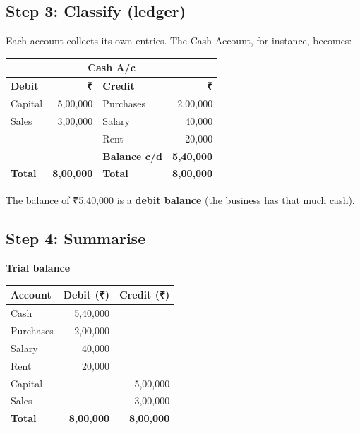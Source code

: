 \documentclass[11pt,a4paper]{article}
\newcommand{\Rs}{{\rsfont ₹}}
\begin{document}
\subsection{Step 3: Classify (ledger)}

Each account collects its own entries. The Cash Account, for instance, becomes:

\begin{center}
\small
\begin{tabular}{@{}p{2.6cm} r | p{2.6cm} r@{}}
\multicolumn{4}{c}{\textbf{Cash A/c}}\\
\hline
\textbf{Debit} & \textbf{\Rs} & \textbf{Credit} & \textbf{\Rs}\\
\hline
Capital & 5,00,000 & Purchases & 2,00,000\\
Sales & 3,00,000 & Salary & 40,000\\
 & & Rent & 20,000\\
 & & \textbf{Balance c/d} & \textbf{5,40,000}\\
\hline
\textbf{Total} & \textbf{8,00,000} & \textbf{Total} & \textbf{8,00,000}\\
\hline
\end{tabular}
\end{center}

The balance of \Rs 5,40,000 is a \textbf{debit balance} (the business has that much cash).

\subsection{Step 4: Summarise}

\textbf{Trial balance}

\begin{center}
\small
\begin{tabular}{@{}l r r@{}}
\toprule
\rowcolor{acteal!15}\textbf{Account} & \textbf{Debit (\Rs)} & \textbf{Credit (\Rs)}\\
\midrule
Cash & 5,40,000 & \\
Purchases & 2,00,000 & \\
Salary & 40,000 & \\
Rent & 20,000 & \\
Capital & & 5,00,000\\
Sales & & 3,00,000\\
\midrule
\textbf{Total} & \textbf{8,00,000} & \textbf{8,00,000}\\
\bottomrule
\end{tabular}
\end{center}
\end{document}
